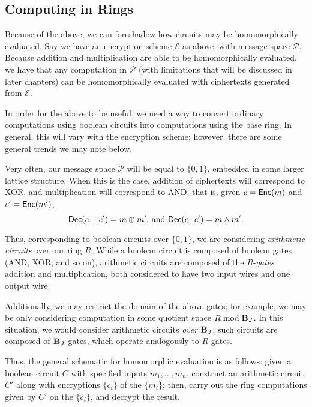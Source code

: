 \subsection{Computing in Rings}
\label{sec: compinrings}
Because of the above, we can foreshadow how circuits may be homomorphically evaluated. Say we have an encryption scheme $\mathcal{E}$ as above, with message space $\mathcal{P}$. Because addition and multiplication are able to be homomorphically evaluated, we have that any computation in $\mathcal{P}$ (with limitations that will be discussed in later chapters) can be homomorphically evaluated with ciphertexts generated from $\mathcal{E}$.

In order for the above to be useful, we need a way to convert ordinary computations using boolean circuits into computations using the base ring. In general, this will vary with the encryption scheme; however, there are some general trends we may note below.

Very often, our message space $\mathcal{P}$ will be equal to $\{0, 1\}$, embedded in some larger lattice structure. When this is the case, addition of ciphertexts will correspond to XOR, and multiplication will correspond to AND; that is, given $c = {\sf Enc}(m)$ and $c' = {\sf Enc}(m')$,
\[{\sf Dec}(c + c') = m \oplus m'\text{, and } {\sf Dec}(c \cdot c') = m \wedge m'.\]

Thus, corresponding to boolean circuits over $\{0, 1\}$, we are considering \emph{arithmetic circuits} over our ring $R$. While a boolean circuit is composed of boolean gates (AND, XOR, and so on), arithmetic circuits are composed of the $R$-\emph{gates} addition and multiplication, both considered to have two input wires and one output wire.

Additionally, we may restrict the domain of the above gates; for example, we may be only considering computation in some quotient space $R \bmod \textbf{B}_J$. In this situation, we would consider arithmetic circuits \emph{over} $\textbf{B}_J$; such circuits are composed of $\textbf{B}_J$-gates, which operate analogously to $R$-gates.

Thus, the general schematic for homomorphic evaluation is as follows: given a boolean circuit $C$ with specified inputs $m_1, \dots, m_n$, construct an arithmetic circuit $C'$ along with encryptions $\{c_i\}$ of the $\{m_i\}$; then, carry out the ring computations given by $C'$ on the $\{c_i\}$, and decrypt the result.
